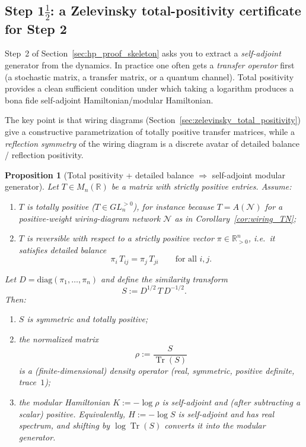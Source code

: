 \documentclass[11pt,oneside]{amsbook}
\numberwithin{equation}{section}
\theoremstyle{plain}
\newtheorem{proposition}[theorem]{Proposition}
\theoremstyle{definition}
\theoremstyle{remark}
\newcommand{\R}{\mathbb{R}}
\DeclareMathOperator{\Tr}{\mathrm{Tr}}
\begin{document}
\subsection{Step 1$\frac12$: a Zelevinsky total-positivity certificate for Step 2}
\label{sec:hp_step1half_totalpositivity}

Step~2 of Section~\ref{sec:hp_proof_skeleton} asks you to extract a \emph{self-adjoint} generator from the dynamics.
In practice one often gets a \emph{transfer operator} first (a stochastic matrix, a transfer matrix, or a quantum channel).
Total positivity provides a clean sufficient condition under which taking a logarithm produces a bona fide self-adjoint Hamiltonian/modular Hamiltonian.

The key point is that wiring diagrams (Section~\ref{sec:zelevinsky_total_positivity}) give a constructive parametrization of totally positive transfer matrices, while a \emph{reflection symmetry} of the wiring diagram is a discrete avatar of detailed balance / reflection positivity.

\begin{proposition}[Total positivity + detailed balance $\Rightarrow$ self-adjoint modular generator]
\label{prop:tp_detailed_balance_modular}
Let $T\in M_n(\R)$ be a matrix with strictly positive entries.
Assume:
\begin{enumerate}[label=(\alph*)]
\item $T$ is totally positive ($T\in GL_n^{>0}$), for instance because $T=A(\mathcal{N})$ for a positive-weight wiring-diagram network $\mathcal{N}$ as in Corollary~\ref{cor:wiring_TN};
\item $T$ is \emph{reversible} with respect to a strictly positive vector $\pi\in\R_{>0}^n$, i.e.\ it satisfies detailed balance
\begin{equation}
\label{eq:detailed_balance}
\pi_i\,T_{ij}=\pi_j\,T_{ji}\qquad \text{for all } i,j.
\end{equation}
\end{enumerate}
Let $D=\mathrm{diag}(\pi_1,\dots,\pi_n)$ and define the similarity transform
\[
S:=D^{1/2}\,T\,D^{-1/2}.
\]
Then:
\begin{enumerate}[label=(\roman*)]
\item $S$ is symmetric and totally positive;
\item the normalized matrix
\[
\rho:=\frac{S}{\Tr(S)}
\]
is a (finite-dimensional) density operator (real, symmetric, positive definite, trace~$1$);
\item the modular Hamiltonian $K:=-\log\rho$ is self-adjoint and (after subtracting a scalar) positive.
Equivalently, $H:=-\log S$ is self-adjoint and has real spectrum, and shifting by $\log\Tr(S)$ converts it into the modular generator.
\end{enumerate}
\end{proposition}
\end{document}
